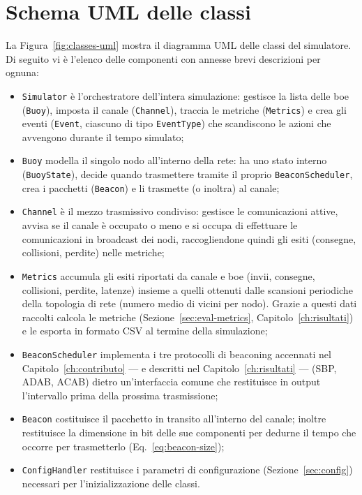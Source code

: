 \section{Schema UML delle classi}
\label{sec:uml}
La Figura~\ref{fig:classes-uml} mostra il diagramma UML delle classi del simulatore. 
Di seguito vi \`e l'elenco delle componenti con annesse brevi descrizioni per ognuna:
\begin{itemize}[leftmargin=1.4em]
  \item \texttt{Simulator} \`e l'orchestratore dell'intera simulazione: gestisce la lista delle boe 
  (\texttt{Buoy}), imposta il canale (\texttt{Channel}), traccia le metriche
  (\texttt{Metrics}) e crea gli eventi (\texttt{Event}, ciascuno di tipo \texttt{EventType})
  che scandiscono le azioni che avvengono durante il tempo simulato;
  \item \texttt{Buoy} modella il singolo nodo all'interno della rete: ha uno stato interno (\texttt{BuoyState}),
  decide quando trasmettere tramite il proprio \texttt{BeaconScheduler}, crea i pacchetti
  (\texttt{Beacon}) e li trasmette (o inoltra) al canale;
  \item \texttt{Channel} \`e il mezzo trasmissivo condiviso: gestisce le comunicazioni attive, avvisa se il canale \`e occupato o meno e
  si occupa di effettuare le comunicazioni in broadcast dei nodi, 
  raccogliendone quindi gli esiti (consegne, collisioni, perdite) nelle metriche;
  \item \texttt{Metrics} accumula gli esiti riportati da canale e boe 
  (invii, consegne, collisioni, perdite, latenze) insieme a quelli ottenuti 
  dalle scansioni periodiche della topologia di rete (numero medio di vicini per nodo). 
  Grazie a questi dati raccolti calcola le metriche (Sezione~\ref{sec:eval-metrics}, Capitolo~\ref{ch:risultati}) e le esporta in formato CSV al termine della simulazione;
  \item \texttt{BeaconScheduler} implementa i tre protocolli di beaconing accennati nel
  Capitolo~\ref{ch:contributo} --- e descritti nel Capitolo~\ref{ch:risultati} --- (SBP, ADAB, ACAB) dietro un'interfaccia comune 
  che restituisce in output l'intervallo prima della prossima trasmissione;
  \item \texttt{Beacon} costituisce il pacchetto in transito all'interno del canale; inoltre restituisce la dimensione in bit delle sue componenti per dedurne 
  il tempo che occorre per trasmetterlo (Eq.~\ref{eq:beacon-size});
  \item \texttt{ConfigHandler} restituisce i parametri di configurazione (Sezione~\ref{sec:config}) necessari per l'inizializzazione delle classi.
\end{itemize}
